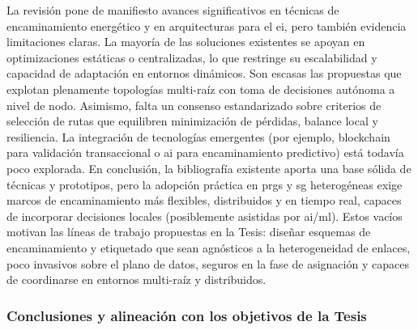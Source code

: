 La revisión pone de manifiesto avances significativos en técnicas de encaminamiento energético y en arquitecturas para el \gls{ei}, pero también evidencia limitaciones claras. La mayoría de las soluciones existentes se apoyan en optimizaciones estáticas o centralizadas, lo que restringe su escalabilidad y capacidad de adaptación en entornos dinámicos. Son escasas las propuestas que explotan plenamente topologías multi-raíz con toma de decisiones autónoma a nivel de nodo. Asimismo, falta un consenso estandarizado sobre criterios de selección de rutas que equilibren minimización de pérdidas, balance local y resiliencia. La integración de tecnologías emergentes (por ejemplo, blockchain para validación transaccional o \gls{ai} para encaminamiento predictivo) está todavía poco explorada. En conclusión, la bibliografía existente aporta una base sólida de técnicas y prototipos, pero la adopción práctica en \glspl{prg} y \gls{sg} heterogéneas exige marcos de encaminamiento más flexibles, distribuidos y en tiempo real, capaces de incorporar decisiones locales (posiblemente asistidas por \gls{ai}/\gls{ml}). Estos vacíos motivan las líneas de trabajo propuestas en la Tesis: diseñar esquemas de encaminamiento y etiquetado que sean agnósticos a la heterogeneidad de enlaces, poco invasivos sobre el plano de datos, seguros en la fase de asignación y capaces de coordinarse en entornos multi-raíz y distribuidos.

\subsubsection{Conclusiones y alineación con los objetivos de la Tesis}

